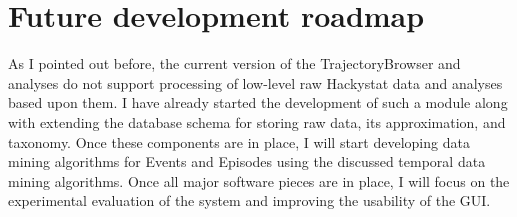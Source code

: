 \section{Future development roadmap}
As I pointed out before, the current version of the TrajectoryBrowser and analyses do not support processing of low-level raw Hackystat data and analyses based upon them. I have already started the development of such a module along with extending the database schema for storing raw data, its approximation, and taxonomy. Once these components are in place, I will start developing data mining algorithms for Events and Episodes using the discussed temporal data mining algorithms. Once all major software pieces are in place, I will focus on the experimental evaluation of the system and improving the usability of the GUI.